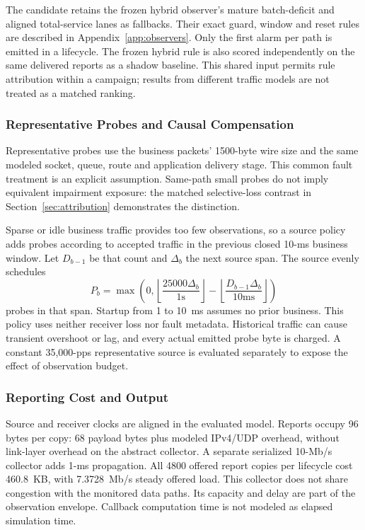 \documentclass[sigconf]{acmart}
\begin{document}
The candidate retains the frozen hybrid observer's mature batch-deficit
and aligned total-service lanes as fallbacks. Their exact guard, window
and reset rules are described in Appendix~\ref{app:observers}. Only the
first alarm per path is emitted in a lifecycle. The frozen hybrid rule
is also scored independently on the same delivered reports as a shadow
baseline. This shared input permits rule attribution within a campaign;
results from different traffic models are not treated as a matched ranking.

\subsubsection{Representative Probes and Causal Compensation}
Representative probes use the business packets' 1500-byte wire size and
the same modeled socket, queue, route and application delivery stage.
This common fault treatment is an explicit assumption. Same-path small
probes do not imply equivalent impairment exposure: the matched selective-loss
contrast in Section~\ref{sec:attribution} demonstrates the distinction.

Sparse or idle business traffic provides too few observations, so a source
policy adds probes according to accepted traffic in the previous closed
10-ms business window. Let $D_{b-1}$ be that count and $\Delta_b$ the next
source span. The source evenly schedules
\[
P_b=\max\!\left(0,
\left\lfloor\frac{25000\Delta_b}{1\mathrm{s}}\right\rfloor-
\left\lfloor\frac{D_{b-1}\Delta_b}{10\mathrm{ms}}\right\rfloor\right)
\]
probes in that span. Startup from 1 to 10~ms assumes no prior business.
This policy uses neither receiver loss nor fault metadata. Historical
traffic can cause transient overshoot or lag, and every actual emitted
probe byte is charged. A constant 35,000-pps representative source is
evaluated separately to expose the effect of observation budget.

\subsubsection{Reporting Cost and Output}
Source and receiver clocks are aligned in the evaluated model. Reports
occupy 96 bytes per copy: 68 payload bytes plus modeled IPv4/UDP overhead,
without link-layer overhead on the abstract collector. A separate serialized
10-Mb/s collector adds 1-ms propagation. All 4800 offered report copies per
lifecycle cost 460.8~KB, with 7.3728~Mb/s steady offered load. This collector
does not share congestion with the monitored data paths. Its capacity and
delay are part of the observation envelope. Callback computation time is
not modeled as elapsed simulation time.
\end{document}
